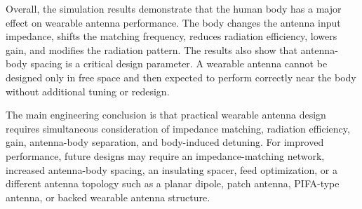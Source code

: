 Overall, the simulation results demonstrate that the human body has a major effect on wearable antenna performance. The body changes the antenna input impedance, shifts the matching frequency, reduces radiation efficiency, lowers gain, and modifies the radiation pattern. The results also show that antenna-body spacing is a critical design parameter. A wearable antenna cannot be designed only in free space and then expected to perform correctly near the body without additional tuning or redesign.

The main engineering conclusion is that practical wearable antenna design requires simultaneous consideration of impedance matching, radiation efficiency, gain, antenna-body separation, and body-induced detuning. For improved performance, future designs may require an impedance-matching network, increased antenna-body spacing, an insulating spacer, feed optimization, or a different antenna topology such as a planar dipole, patch antenna, PIFA-type antenna, or backed wearable antenna structure.
